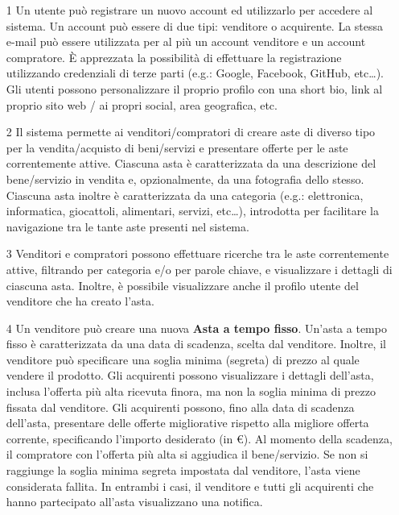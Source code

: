         \begin{itemize}
            \item[1] Un utente può registrare un nuovo account ed utilizzarlo per accedere al sistema. Un account può essere di due tipi: venditore o acquirente. La stessa e-mail può essere utilizzata per al più un account venditore e un account compratore. È apprezzata la possibilità di effettuare la registrazione utilizzando credenziali di terze parti (e.g.: Google, Facebook, GitHub, etc…). Gli utenti possono personalizzare il proprio profilo con una short bio, link al proprio sito web / ai propri social, area geografica, etc.
            
            \item[2] Il sistema permette ai venditori/compratori di creare aste di diverso tipo per la vendita/acquisto di beni/servizi e presentare offerte per le aste correntemente attive. Ciascuna asta è caratterizzata da una descrizione del bene/servizio in vendita e, opzionalmente, da una fotografia dello stesso. Ciascuna asta inoltre è caratterizzata da una categoria (e.g.: elettronica, informatica, giocattoli, alimentari, servizi, etc…), introdotta per facilitare la navigazione tra le tante aste presenti nel sistema.
          
            \item[3] Venditori e compratori possono effettuare ricerche tra le aste correntemente attive, filtrando per categoria e/o per parole chiave, e visualizzare i dettagli di ciascuna asta. Inoltre, è possibile visualizzare anche il profilo utente del venditore che ha creato l’asta.
          
            \item[4] Un venditore può creare una nuova \textbf{Asta a tempo fisso}. Un’asta a tempo fisso è caratterizzata da una data di scadenza, scelta dal venditore. Inoltre, il venditore può specificare una soglia minima (segreta) di prezzo al quale vendere il prodotto. Gli acquirenti possono visualizzare i dettagli dell’asta, inclusa l’offerta più alta ricevuta finora, ma non la soglia minima di prezzo fissata dal venditore. Gli acquirenti possono, fino alla data di scadenza dell’asta, presentare delle offerte migliorative rispetto alla migliore offerta corrente, specificando l’importo desiderato (in €). Al momento della scadenza, il compratore con l’offerta più alta si aggiudica il bene/servizio. Se non si raggiunge la soglia minima segreta impostata dal venditore, l’asta viene considerata fallita. In entrambi i casi, il venditore e tutti gli acquirenti che hanno partecipato all’asta visualizzano una notifica.
            

\end{itemize}

